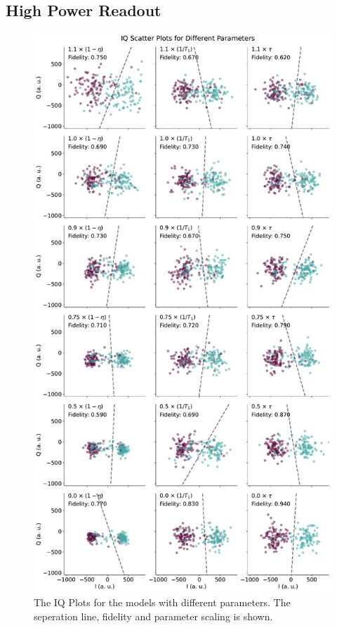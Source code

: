 \subsection{High Power Readout}

\begin{figure}
    \centering
    \includegraphics{Simulations/budgets/figures/iq_scatter_budgetting.pdf}
    \caption{The IQ Plots for the models  with different parameters. The seperation line, fidelity and parameter scaling is shown.}
    \label{fig:budgetting_IQ_plots}
\end{figure}


